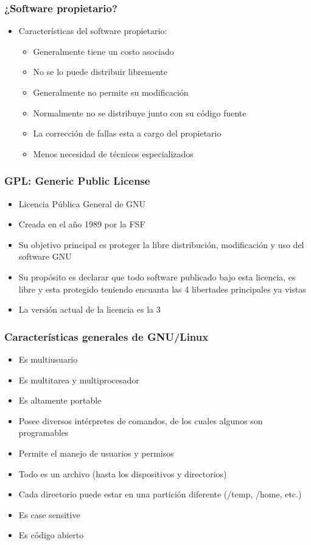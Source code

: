 \begin{frame}
	\frametitle{¿Software propietario?}
	\begin{itemize}
		\item Características del software propietario:
		\begin{itemize}
			\item Generalmente tiene un costo asociado
			\item No se lo puede distribuir libremente
			\item Generalmente no permite su modificación
			\item Normalmente no se distribuye junto con su código fuente
			\item La corrección de fallas esta a cargo del propietario
			\item Menos necesidad de técnicos especializados
		\end{itemize}
	\end{itemize}
\end{frame}

\begin{frame}
	\frametitle{GPL: Generic Public License}
	\begin{itemize}
		\item Licencia Pública General de GNU
		\item Creada en el año 1989 por la FSF
		\item Su objetivo principal es proteger la libre distribución, modificación y uso del software GNU
		\item Su propósito es declarar que todo software publicado bajo esta licencia, es libre y esta protegido teniendo encuanta las 4 libertades principales ya vistas
		\item La versión actual de la licencia es la 3
	\end{itemize}
\end{frame}

\begin{frame}
	\frametitle{Características generales de GNU/Linux}
	\begin{itemize}
		\item Es multiusuario
		\item Es multitarea y multiprocesador
		\item Es altamente portable
		\item Posee diversos intérpretes de comandos, de los cuales algunos son programables
		\item Permite el manejo de usuarios y permisos
		\item Todo es un archivo (hasta los dispositivos y directorios)
		\item Cada directorio puede estar en una partición diferente (/temp, /home, etc.)		
		\item Es case sensitive
		\item Es código abierto
	\end{itemize}
\end{frame}

